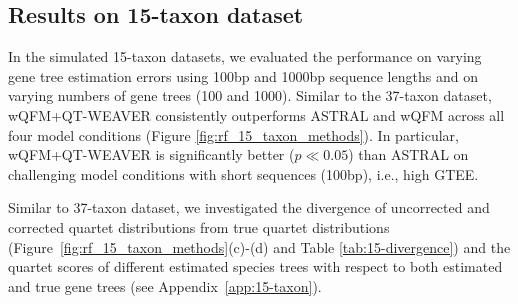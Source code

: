 \documentclass[runningheads]{llncs}
\begin{document}

\subsection{Results on 15-taxon dataset}

In the simulated 15-taxon datasets, we evaluated the performance on varying gene tree estimation errors using 100bp and 1000bp sequence lengths and on varying numbers of gene trees (100 and 1000). Similar to the 37-taxon dataset, wQFM+QT-WEAVER consistently outperforms ASTRAL and wQFM across all four model conditions (Figure \ref{fig:rf_15_taxon_methods}). In particular, wQFM+QT-WEAVER is significantly better ($p \ll 0.05$) than ASTRAL on challenging model conditions with short sequences (100bp), i.e., high GTEE. %

Similar to 37-taxon dataset, we investigated the divergence of uncorrected and corrected quartet distributions from true quartet distributions (Figure~\ref{fig:rf_15_taxon_methods}(c)-(d) and Table \ref{tab:15-divergence}) and the quartet scores of different estimated species trees with respect to both estimated and true gene trees (see Appendix~\ref{app:15-taxon}). 



\end{document}
